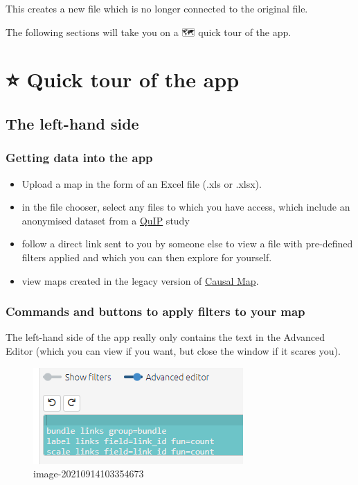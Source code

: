 \documentclass[
]{book}
\providecommand{\tightlist}{%
  \setlength{\itemsep}{0pt}\setlength{\parskip}{0pt}}
\begin{document}
This creates a new file which is no longer connected to the original file.

The following sections will take you on a 🗺 quick tour of the app.

\hypertarget{quick-tour-of-the-app}{%
\chapter{⭐ Quick tour of the app}\label{quick-tour-of-the-app}}

\hypertarget{the-left-hand-side}{%
\section{The left-hand side}\label{the-left-hand-side}}

\hypertarget{getting-data-into-the-app}{%
\subsection{Getting data into the app}\label{getting-data-into-the-app}}

\begin{itemize}
\tightlist
\item
  Upload a map in the form of an Excel file (.xls or .xlsx).
\item
  in the file chooser, select any files to which you have access, which include an anonymised dataset from a \href{http://bathsdr.org/}{QuIP} study
\item
  follow a direct link sent to you by someone else to view a file with pre-defined filters applied and which you can then explore for yourself.
\item
  view maps created in the legacy version of \href{http://causalmap.app/}{Causal Map}.
\end{itemize}

\hypertarget{commands-and-buttons-to-apply-filters-to-your-map}{%
\subsection{Commands and buttons to apply filters to your map}\label{commands-and-buttons-to-apply-filters-to-your-map}}

The left-hand side of the app really only contains the text in the Advanced Editor (which you can view if you want, but close the window if it scares you).

\begin{figure}
\centering
\includegraphics{_assets/image-20210914103354673.png}
\caption{image-20210914103354673}
\end{figure}
\end{document}
